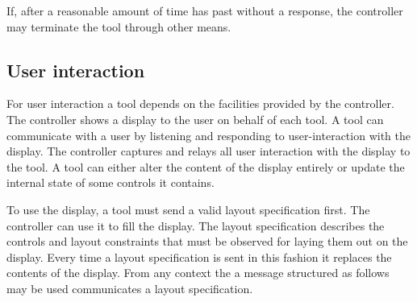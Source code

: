\documentclass{article}
\begin{document}
   If, after a reasonable amount of time has past without a response, the
   controller may terminate the tool through other means.

  \pagebreak

  \subsection{User interaction} \label{ss:user_interaction}

   For user interaction a tool depends on the facilities provided by the
   controller. The controller shows a display to the user on behalf of each
   tool.  A tool can communicate with a user by listening and responding to
   user-interaction with the display. The controller captures and relays all
   user interaction with the display to the tool. A tool can either alter the
   content of the display entirely or update the internal state of some
   controls it contains.

   To use the display, a tool must send a valid layout specification first.
   The controller can use it to fill the display. The layout specification
   describes the controls and layout constraints that must be observed for
   laying them out on the display. Every time a layout specification is sent in
   this fashion it replaces the contents of the display. From any context the
   a message structured as follows may be used communicates a layout specification.
   
\end{document}
